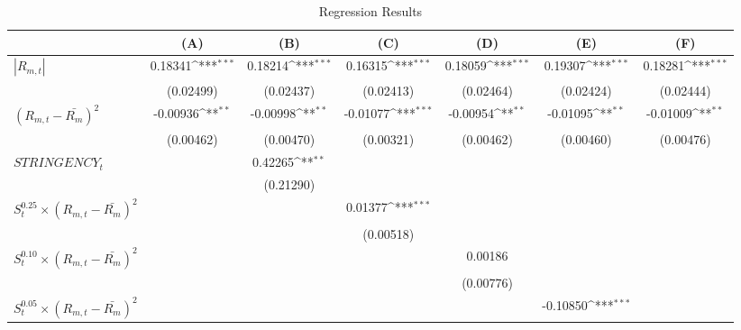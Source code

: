 \begin{table}[htbp]\small \centering
\def\sym#1{\ifmmode^{#1}\else\(^{#1}\)\fi}
\caption{Regression Results \label{reg1}}
\begin{tabular}{l*{6}{c}}
\toprule
                    &\multicolumn{1}{c}{(A)}         &\multicolumn{1}{c}{(B)}         &\multicolumn{1}{c}{(C)}         &\multicolumn{1}{c}{(D)}         &\multicolumn{1}{c}{(E)}         &\multicolumn{1}{c}{(F)}         \\
\midrule
$|R_{m,t}|$&     0.18341\sym{***}&     0.18214\sym{***}&     0.16315\sym{***}&     0.18059\sym{***}&     0.19307\sym{***}&     0.18281\sym{***}\\
                    &   (0.02499)         &   (0.02437)         &   (0.02413)         &   (0.02464)         &   (0.02424)         &   (0.02444)         \\
\addlinespace
$(R_{m,t}-\bar{R_m})^2$&    -0.00936\sym{**} &    -0.00998\sym{**} &    -0.01077\sym{***}&    -0.00954\sym{**} &    -0.01095\sym{**} &    -0.01009\sym{**} \\
                    &   (0.00462)         &   (0.00470)         &   (0.00321)         &   (0.00462)         &   (0.00460)         &   (0.00476)         \\
\addlinespace
$STRINGENCY_t$    &                     &     0.42265\sym{**} &                     &                     &                     &                     \\
                    &                     &   (0.21290)         &                     &                     &                     &                     \\
\addlinespace
$S_t^{0.25}\times{(R_{m,t}-\bar{R_m})^2}$&                     &                     &     0.01377\sym{***}&                     &                     &                     \\
                    &                     &                     &   (0.00518)         &                     &                     &                     \\
\addlinespace
$S_t^{0.10}\times{(R_{m,t}-\bar{R_m})^2}$&                     &                     &                     &     0.00186         &                     &                     \\
                    &                     &                     &                     &   (0.00776)         &                     &                     \\
\addlinespace
$S_t^{0.05}\times{(R_{m,t}-\bar{R_m})^2}$&                     &                     &                     &                     &    -0.10850\sym{***}&                     \\

\end{tabular}
\end{table}
